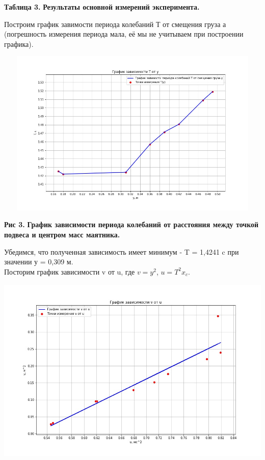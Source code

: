 \begin{flushright}
{\scriptsize \textbf{Таблица 3.} \textbf {Результаты основной измерений эксперимента.}}
\end{flushright}

    Построим график завимости периода колебаний Т от смещения груза а (погрешность измерения периода мала, её мы не учитываем при построении графика). 

\begin{center}
\includegraphics[width=15cm, height=8cm]{graph_1.jpg}
\end{center}

\begin{flushright}
{\scriptsize \textbf{Рис 3.} \textbf {График зависимости периода колебаний от расстояния между точкой подвеса и центром масс маятника.}}
\end{flushright}

    Убедимся, что полученная зависимость имеет минимум - T = 1,4241 c при значении у = 0,309 м.\\


    
    Посторим график зависимости v от u, где $v = y^2$, $u = T^2x_c$.



\begin{center}
\includegraphics[width=15cm, height=9cm]{graph_2.jpg}
\end{center}

